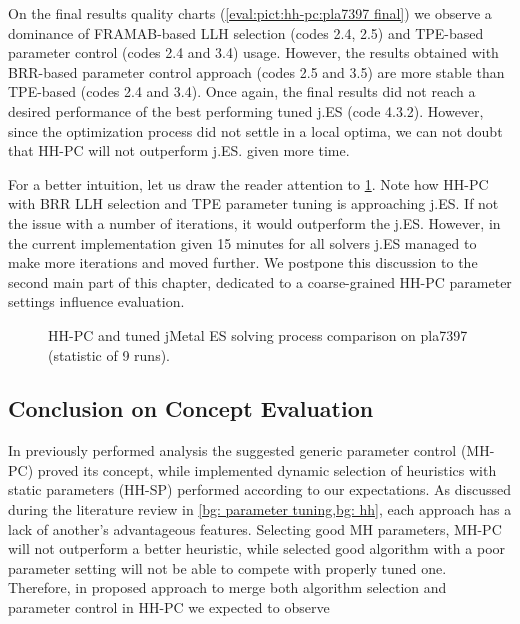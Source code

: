 On the final results quality charts (\cref{eval:pict:hh-pc:pla7397 final}) we observe a dominance of FRAMAB-based LLH selection (codes 2.4, 2.5) and TPE-based parameter control (codes 2.4 and 3.4) usage. However, the results obtained with BRR-based parameter control approach (codes 2.5 and 3.5) are more stable than TPE-based (codes 2.4 and 3.4). Once again, the final results did not reach a desired performance of the best performing tuned j.ES (code 4.3.2). However, since the optimization process did not settle in a local optima, we can not doubt that HH-PC will not outperform j.ES. given more time. 

For a better intuition, let us draw the reader attention to \cref{eval:pict:hh-pc vs jES on pla7397 process}. Note how HH-PC with BRR LLH selection and TPE parameter tuning is approaching j.ES. If not the issue with a number of iterations, it would outperform the j.ES. However, in the current implementation given 15 minutes for all solvers j.ES managed to make more iterations and moved further. We postpone this discussion to the second main part of this chapter, dedicated to a coarse-grained HH-PC parameter settings influence evaluation.

\begin{figure}[t]
	\centering
	\vspace{-20pt}
	
	\caption{HH-PC and tuned jMetal ES solving process comparison on pla7397 (statistic of 9 runs).}
	\vspace{-5pt}
	\label{eval:pict:hh-pc vs jES on pla7397 process}
\end{figure}

\subsection{Conclusion on Concept Evaluation}\label{eval: concept eval conclusion}
In previously performed analysis the suggested generic parameter control (MH-PC) proved its concept, while implemented dynamic selection of heuristics with static parameters (HH-SP) performed according to our expectations. As discussed during the literature review in \cref{bg: parameter tuning,bg: hh}, each approach has a lack of another's advantageous features. Selecting good MH parameters, MH-PC will not outperform a better heuristic, while selected good algorithm with a poor parameter setting will not be able to compete with properly tuned one. Therefore, in proposed approach to merge both algorithm selection and parameter control in HH-PC we expected to observe 

